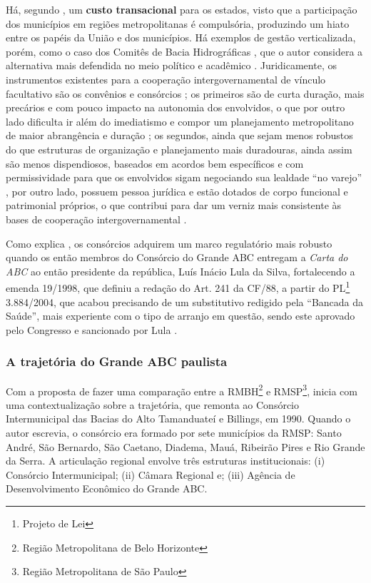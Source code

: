 \documentclass[
article,			%
11pt,				%
oneside,			%
a4paper,			%
english,			%
brazil,				%
sumario=tradicional
]{abntex2}
\begin{document}
	Há, segundo , um \textbf{custo transacional} para os estados, visto que a participação dos municípios em regiões metropolitanas é compulsória, produzindo um hiato entre os papéis da União e dos municípios. Há exemplos de gestão verticalizada, porém, como o caso dos Comitês de Bacia Hidrográficas \cite[p. 62]{machado2009}, que o autor considera a alternativa mais defendida no meio político e acadêmico \cite[p. 63]{machado2009}. Juridicamente, os instrumentos existentes para a cooperação intergovernamental de vínculo facultativo são os convênios e consórcios \cite[p. 63]{machado2009}; os primeiros são de curta duração, mais precários e com pouco impacto na autonomia dos envolvidos, o que por outro lado dificulta ir além do imediatismo e compor um planejamento metropolitano de maior abrangência e duração \cite[p. 64]{machado2009}; os segundos, ainda que sejam menos robustos do que estruturas de organização e planejamento mais duradouras, ainda assim são menos dispendiosos, baseados em acordos bem específicos e com permissividade para que os envolvidos sigam negociando sua lealdade ``no varejo'' \cite[p. 63]{machado2009}, por outro lado, possuem pessoa jurídica e estão dotados de corpo funcional e patrimonial próprios, o que contribui para dar um verniz mais consistente às bases de cooperação intergovernamental \cite[p. 64]{machado2009}.
	
	Como explica , os consórcios adquirem um marco regulatório mais robusto quando os então membros do Consórcio do Grande ABC entregam a \textit{Carta do ABC} ao então presidente da república, Luís Inácio Lula da Silva, fortalecendo a emenda 19/1998, que definiu a redação do Art. 241 da CF/88, a partir do PL\footnote{Projeto de Lei} 3.884/2004, que acabou precisando de um substitutivo redigido pela ``Bancada da Saúde'', mais experiente com o tipo de arranjo em questão, sendo este aprovado pelo Congresso e sancionado por Lula \cite[p. 67]{machado2009}.
	
	\subsubsection{A trajetória do Grande ABC paulista}
	
	Com a proposta de fazer uma comparação entre a RMBH\footnote{Região Metropolitana de Belo Horizonte} e RMSP\footnote{Região Metropolitana de São Paulo},  inicia com uma contextualização sobre a trajetória, que remonta ao Consórcio Intermunicipal das Bacias do Alto Tamanduateí e Billings, em 1990. Quando o autor escrevia, o consórcio era formado por sete municípios da RMSP: Santo André, São Bernardo, São Caetano, Diadema, Mauá, Ribeirão Pires e Rio Grande da Serra. A articulação regional envolve três estruturas institucionais: (i) Consórcio Intermunicipal; (ii) Câmara Regional e; (iii) Agência de Desenvolvimento Econômico do Grande ABC.
	
\end{document}
